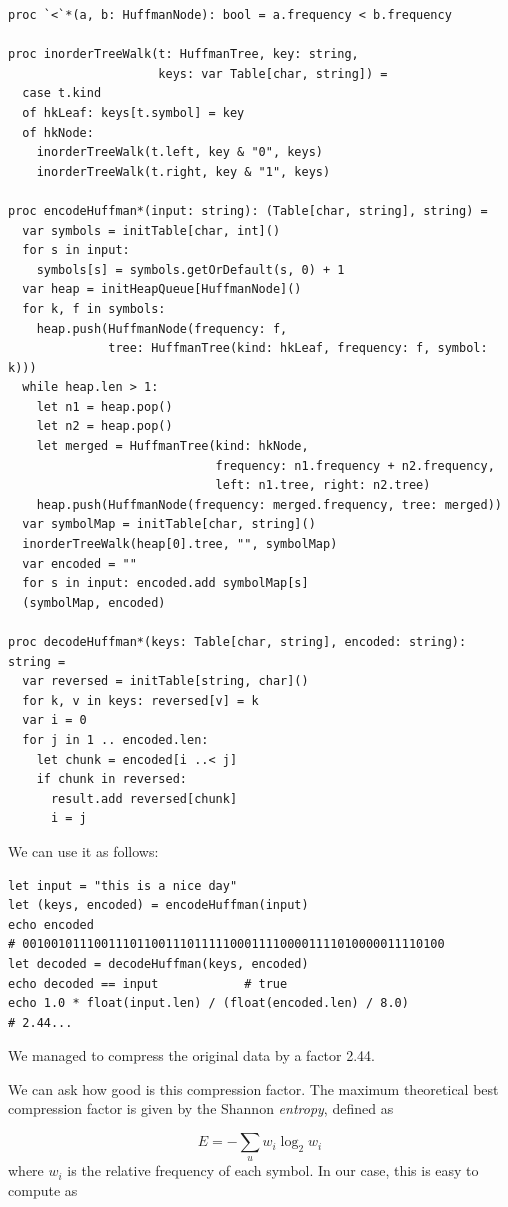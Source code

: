 \documentclass[justified, sixbynine]{tufte-book}
\def\ft{\small\tt}
\theoremstyle{plain}%
\newtheorem * {corollary}{Corollary}
\theoremstyle{definition}
\theoremstyle{remark}
\newtheorem * {remark}{Remark}
\newtheorem * {note}{Note}
\begin{document}
\begin{fullwidth}
\begin{lstlisting}[caption={in file: {\ft nlib/compression.nim}}]
proc `<`*(a, b: HuffmanNode): bool = a.frequency < b.frequency

proc inorderTreeWalk(t: HuffmanTree, key: string,
                     keys: var Table[char, string]) =
  case t.kind
  of hkLeaf: keys[t.symbol] = key
  of hkNode:
    inorderTreeWalk(t.left, key & "0", keys)
    inorderTreeWalk(t.right, key & "1", keys)

proc encodeHuffman*(input: string): (Table[char, string], string) =
  var symbols = initTable[char, int]()
  for s in input:
    symbols[s] = symbols.getOrDefault(s, 0) + 1
  var heap = initHeapQueue[HuffmanNode]()
  for k, f in symbols:
    heap.push(HuffmanNode(frequency: f,
              tree: HuffmanTree(kind: hkLeaf, frequency: f, symbol: k)))
  while heap.len > 1:
    let n1 = heap.pop()
    let n2 = heap.pop()
    let merged = HuffmanTree(kind: hkNode,
                             frequency: n1.frequency + n2.frequency,
                             left: n1.tree, right: n2.tree)
    heap.push(HuffmanNode(frequency: merged.frequency, tree: merged))
  var symbolMap = initTable[char, string]()
  inorderTreeWalk(heap[0].tree, "", symbolMap)
  var encoded = ""
  for s in input: encoded.add symbolMap[s]
  (symbolMap, encoded)

proc decodeHuffman*(keys: Table[char, string], encoded: string): string =
  var reversed = initTable[string, char]()
  for k, v in keys: reversed[v] = k
  var i = 0
  for j in 1 .. encoded.len:
    let chunk = encoded[i ..< j]
    if chunk in reversed:
      result.add reversed[chunk]
      i = j
\end{lstlisting}

We can use it as follows:

\begin{lstlisting}
let input = "this is a nice day"
let (keys, encoded) = encodeHuffman(input)
echo encoded
# 00100101110011101100111011111000111100001111010000011110100
let decoded = decodeHuffman(keys, encoded)
echo decoded == input            # true
echo 1.0 * float(input.len) / (float(encoded.len) / 8.0)
# 2.44...
\end{lstlisting}

We managed to compress the original data by a factor 2.44.


We can ask how good is this compression factor.
The maximum theoretical best compression factor is given by the Shannon {\it entropy}, defined as

\begin{equation}
E = -\sum_u w_i \log_2 w_i
\end{equation}
where $w_i$ is the relative frequency of each symbol.
In our case, this is easy to compute as


\end{fullwidth}
\end{document}
